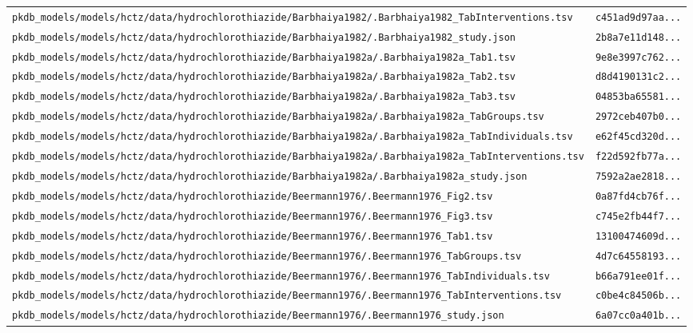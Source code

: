 \documentclass{article}
\begin{document}
\begin{longtable}{ll}
\texttt{pkdb\_models/models/hctz/data/hydrochlorothiazide/Barbhaiya1982/.Barbhaiya1982\_TabInterventions.tsv} & \texttt{c451ad9d97aa...} \\
\texttt{pkdb\_models/models/hctz/data/hydrochlorothiazide/Barbhaiya1982/.Barbhaiya1982\_study.json} & \texttt{2b8a7e11d148...} \\
\texttt{pkdb\_models/models/hctz/data/hydrochlorothiazide/Barbhaiya1982a/.Barbhaiya1982a\_Tab1.tsv} & \texttt{9e8e3997c762...} \\
\texttt{pkdb\_models/models/hctz/data/hydrochlorothiazide/Barbhaiya1982a/.Barbhaiya1982a\_Tab2.tsv} & \texttt{d8d4190131c2...} \\
\texttt{pkdb\_models/models/hctz/data/hydrochlorothiazide/Barbhaiya1982a/.Barbhaiya1982a\_Tab3.tsv} & \texttt{04853ba65581...} \\
\texttt{pkdb\_models/models/hctz/data/hydrochlorothiazide/Barbhaiya1982a/.Barbhaiya1982a\_TabGroups.tsv} & \texttt{2972ceb407b0...} \\
\texttt{pkdb\_models/models/hctz/data/hydrochlorothiazide/Barbhaiya1982a/.Barbhaiya1982a\_TabIndividuals.tsv} & \texttt{e62f45cd320d...} \\
\texttt{pkdb\_models/models/hctz/data/hydrochlorothiazide/Barbhaiya1982a/.Barbhaiya1982a\_TabInterventions.tsv} & \texttt{f22d592fb77a...} \\
\texttt{pkdb\_models/models/hctz/data/hydrochlorothiazide/Barbhaiya1982a/.Barbhaiya1982a\_study.json} & \texttt{7592a2ae2818...} \\
\texttt{pkdb\_models/models/hctz/data/hydrochlorothiazide/Beermann1976/.Beermann1976\_Fig2.tsv} & \texttt{0a87fd4cb76f...} \\
\texttt{pkdb\_models/models/hctz/data/hydrochlorothiazide/Beermann1976/.Beermann1976\_Fig3.tsv} & \texttt{c745e2fb44f7...} \\
\texttt{pkdb\_models/models/hctz/data/hydrochlorothiazide/Beermann1976/.Beermann1976\_Tab1.tsv} & \texttt{13100474609d...} \\
\texttt{pkdb\_models/models/hctz/data/hydrochlorothiazide/Beermann1976/.Beermann1976\_TabGroups.tsv} & \texttt{4d7c64558193...} \\
\texttt{pkdb\_models/models/hctz/data/hydrochlorothiazide/Beermann1976/.Beermann1976\_TabIndividuals.tsv} & \texttt{b66a791ee01f...} \\
\texttt{pkdb\_models/models/hctz/data/hydrochlorothiazide/Beermann1976/.Beermann1976\_TabInterventions.tsv} & \texttt{c0be4c84506b...} \\
\texttt{pkdb\_models/models/hctz/data/hydrochlorothiazide/Beermann1976/.Beermann1976\_study.json} & \texttt{6a07cc0a401b...} \\

\end{longtable}
\end{document}
